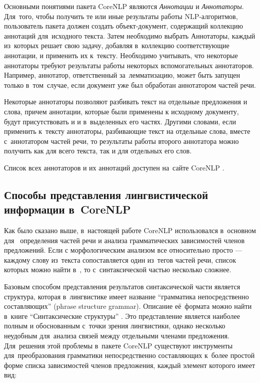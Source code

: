 Основными понятиями пакета CoreNLP являются {\it Аннотации} и {\it Аннотаторы}. 
Для~того, чтобы получить те или иные результаты работы NLP-алгоритмов,
пользователь пакета должен создать объект-документ,
содержащий коллекцию аннотаций для~исходного текста. 
Затем необходимо выбрать Аннотаторы, каждый из~которых решает свою задачу, 
добавляя в~коллекцию соответствующие аннотации, и применить их к~тексту. 
Необходимо учитывать, что некоторые аннотаторы требуют результаты работы некоторых вспомогательных аннотаторов.
Например, аннотатор, ответственный за~лемматизацию, может быть запущен
только в~том~случае, если документ уже был обработан аннотатором частей речи.

Некоторые аннотаторы позволяют разбивать текст на отдельные предложения и слова,
причем аннотации, которые были применены к исходному документу, будут присутствовать и
и в~выделенных его частях. 
Другими словами, если применить к~тексту аннотаторы, разбивающие текст на отдельные слова,
вместе с~аннотатором частей речи, то результаты работы второго аннотатора 
можно получить как для всего текста, так и для отдельных его слов.

Список всех аннотаторов и их аннотаций доступен на~сайте CoreNLP \cite{corenlp}.

\subsection{Способы представления лингвистической информации в~CoreNLP}
\label{sec:corenlp_representation_methods}
Как было сказано выше, в~настоящей работе CoreNLP использовался в~основном для~
определения частей речи и анализа грамматических зависимостей членов предложений.
Если с морфологическим анализом все относительно просто ---
 каждому слову из~текста сопоставляется один из~тегов частей речи, список которых можно найти в~\cite{treebank},
то с~синтаксической частью несколько сложнее.

Базовым способом представления результатов синтаксической части является структура,
которая в~лингвистике имеет название ``грамматика непосредственно составляющих'' (phrase structure grammar). 
Описание её~формата можно найти в~книге ``Синтаксические структуры'' \cite{homsky}.
Это представление является наиболее полным и обоснованным с~точки зрения лингвистики, 
однако несколько неудобным для~анализа связей между отдельными членами предложения.
Для~решения этой проблемы в~пакете CoreNLP существуют инструменты 
для~преобразования грамматики непосредственно составляющих к~более простой форме списка зависимостей членов предложения, 
каждый элемент которого имеет вид:

